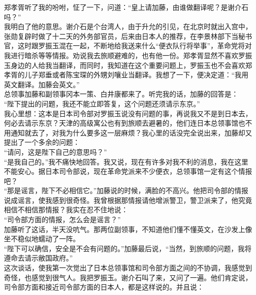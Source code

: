 郑孝胥听了我的吩咐，怔了一下，问道：“皇上请加藤，由谁做翻译呢？是谢介石吗？”\\

我明白了他的意思。谢介石是个台湾人，由于升允的引见，在北京时就出入宫中，张勋复辟时做了十二天的外务部官员，后来由日本人的推荐，在李景林部下当秘书官，这时跟罗振玉混在一起，不断地给我送来什么“便衣队行将举事”，革命党将对我进行暗杀等等情报。劝说我去旅顺避难的，也有他一份。郑孝胥显然不喜欢罗振玉身边的人给我当翻译，而同时，我知道在这个重要问题上，罗振玉也不会喜欢郑孝胥的儿子郑垂或者陈宝琛的外甥刘嚷业当翻译。我想了一下，便决定道：“我用英文翻译。加藤会英文。”\\

总领事加藤和副领事冈本一策、白井康都来了。听完我的话，加藤的回答是：\\

“陛下提出的问题，我还不能立即答复，这个问题还须请示东京。”\\

我心里想：这本是日本司令部对罗振玉说没有问题的事，再说我又不是到日本去，何必去请示东京？天津的高级寓公也有到旅顺去避暑的，他们连日本总领事馆也不用通知就去了，对我为什么要多这一层麻烦？我心里的话没完全说出来，加藤却又提出了一个多余的问题：\\

“请问，这是陛下自己的意思吗？”\\

“是我自己的。”我不痛快地回答。我又说，现在有许多对我不利的消息，我在这里不能安心。据日本司令部说，现在革命党派来不少便衣，总领事馆一定有这个情报吧？\\

“那是谣言，陛下不必相信它。”加藤说的时候，满脸的不高兴。他把司令部的情报说成谣言，使我感到很奇怪。我曾根据那情报请他增派警卫，警卫派来了，他究竟相信不相信那情报？我实在忍不住地说：\\

“司令部方面的情报，怎么会是谣言？”\\

加藤听了这话，半天没吭气。那两位副领事，不知道他们懂不懂英文，在沙发上像坐不稳似地蠕动了一阵。\\

“陛下可以确信，安全是不会有问题的。”加藤最后说，“当然，到旅顺的问题，我将遵命去请示敝国政府。”\\

这次谈话，使我第一次觉出了日本总领事馆和司令部方面之间的不协调，我感觉到奇怪，也感觉到很气人。我把罗振玉。谢介石叫了来，又问了一遍。他们肯定说，司令部方面和接近司令部方面的日本人，都是这样说的。并且说：\\

